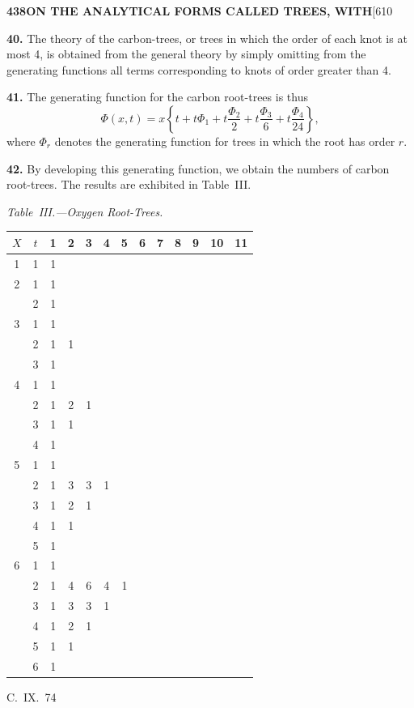 \documentclass[11pt,a4paper]{article}
\begin{document}
{\newpage
\noindent\textbf{438}\hspace{\fill}\textbf{ON THE ANALYTICAL FORMS CALLED TREES, WITH}\hspace{\fill}[610

\noindent\textbf{40.}
The theory of the carbon-trees, or trees in which the order of each knot is at most 4, is obtained from the general theory by simply omitting from the generating functions all terms corresponding to knots of order greater than 4.

\medskip
\noindent\textbf{41.}
The generating function for the carbon root-trees is thus
\[
\Phi(x,t) = x\left\{t + t\Phi_1 + t\frac{\Phi_2}{2} + t\frac{\Phi_3}{6} + t\frac{\Phi_4}{24}\right\},
\]
where $\Phi_r$ denotes the generating function for trees in which the root has order $r$.

\medskip
\noindent\textbf{42.}
By developing this generating function, we obtain the numbers of carbon root-trees. The results are exhibited in Table~III.

\medskip
\noindent\textit{Table~III.---Oxygen Root-Trees.}
\begin{center}
\small
\begin{longtable}{|c|c|c|c|c|c|c|c|c|c|c|c|c|}
\hline
$X$ & $t$ & 1 & 2 & 3 & 4 & 5 & 6 & 7 & 8 & 9 & 10 & 11 \\
\hline
\endfirsthead
1 & 1 & 1 & & & & & & & & & & \\
\hline
2 & 1 & 1 & & & & & & & & & & \\
  & 2 & 1 & & & & & & & & & & \\
\hline
3 & 1 & 1 & & & & & & & & & & \\
  & 2 & 1 & 1 & & & & & & & & & \\
  & 3 & 1 & & & & & & & & & & \\
\hline
4 & 1 & 1 & & & & & & & & & & \\
  & 2 & 1 & 2 & 1 & & & & & & & & \\
  & 3 & 1 & 1 & & & & & & & & & \\
  & 4 & 1 & & & & & & & & & & \\
\hline
5 & 1 & 1 & & & & & & & & & & \\
  & 2 & 1 & 3 & 3 & 1 & & & & & & & \\
  & 3 & 1 & 2 & 1 & & & & & & & & \\
  & 4 & 1 & 1 & & & & & & & & & \\
  & 5 & 1 & & & & & & & & & & \\
\hline
6 & 1 & 1 & & & & & & & & & & \\
  & 2 & 1 & 4 & 6 & 4 & 1 & & & & & & \\
  & 3 & 1 & 3 & 3 & 1 & & & & & & & \\
  & 4 & 1 & 2 & 1 & & & & & & & & \\
  & 5 & 1 & 1 & & & & & & & & & \\
  & 6 & 1 & & & & & & & & & & \\
\hline
\end{longtable}
\end{center}
\hfill C.~IX.\ 74

}
\end{document}
